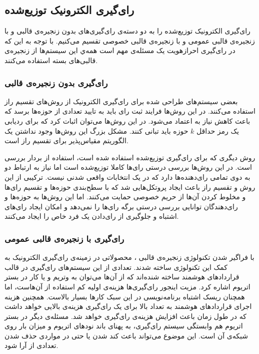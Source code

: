 \subsection{رای‌گیری الکترونیک توزیع‌شده}
رای‌گیری الکترونیک توزیع‌شده را به دو دسته‌ی رای‌گیری‌های بدون زنجیره‌ی قالبی و با زنجیره‌ی قالبی عمومی و با زنجیره‌ی قالبی خصوصی تقسیم می‌کنیم. با توجه به این که در رای‌گیری احرازهویت یک مسئله‌ی مهم است همه‌ي این سیستم‌ها از زنجیره‌ی قالبی‌های بسته استفاده می‌کنند.
\subsubsection{رای‌گیری بدون زنجیره‌ی قالبی} 
بعضی سیستم‌های طراحی شده برای رای‌گیری الکترونیک
\cite{secret1}
\cite{secret2}
\cite{secret3}
 از روش‌های تقسیم راز
 استفاده می‌کنند. در این روش‌ها فرایند ثبت رای باید به تایید تعدادی از حوزه‌ها برسد که باعث کاهش نیاز به اعتماد می‌شود. در این روش‌ها می‌توان اثبات کرد که برای ردیابی یک رمز حداقل $k$ حوزه باید تبانی کنند. مشکل بزرگ این روش‌ها وجود نداشتن یک الگوریتم مقیاس‌پذیر برای تقسیم راز است.
 \par
 روش دیگری که برای رای‌گیری توزیع‌شده استفاده شده است، استفاده از بردار‌ بررسی
 \cite{checkvector}
 است. در این روش‌ها بررسی درستی رای‌ها کاملا توزیع‌شده‌ است اما نیاز به ارتباط دو به دوی تمامی رای‌دهنده‌ها دارد که در یک انتخابات واقعی شدنی نیست. ترکیبی از این روش و تقسیم راز باعث ایجاد پروتکل‌هایی
 \cite{MPO1} \cite{evotinwocrypto}
  شد که با سطح‌بندی حوزه‌ها و تقسیم رای‌ها و مخلوط کردن آن‌ها از حریم خصوصی حمایت می‌کنند. اما این روش‌ها به حوزه‌ها و رای‌دهندگان توانایی بررسی درستی برگه رای‌ها را نمی‌دهد و امکان ایجاد رای‌های اشتباه و جلوگیری از رای‌دادن یک فرد خاص را ایجاد می‌کنند. 


\subsubsection{رای‌گیری با زنجیره‌ی قالبی عمومی}
با فراگیر شدن تکنولوژی زنجیره‌ی قالبی
\cite{rosgood}
، محصولاتی در زمینه‌ی رای‌گیری الکترونیک به کمک این تکنولوژی ساخته شدند. تعدادی از این سیستم‌های رای‌گیری در قالب قرارداد‌های هوشمند ساخته‌ شنده‌اند که از آن‌ها می‌توان به وتریم 
\cite{votereum}
و یا کار 
\cite{yavuz}
در بستر اتریوم اشاره کرد. مزیت اینجور رای‌گیری‌ها هزینه‌ی اولیه کم استفاده از آن‌هاست، اما همچنان ریسک اشتباه برنامه‌نویسی در این سبک کارها بسیار بالاست. همچنین هزینه اجرای قراردادهای هوشمند به تعداد بالا برای یک رای‌گیری هزینه‌ی بالایی خواهد داشت که در طول زمان باعث افزایش هزینه‌ی رای‌گیری خواهد شد. مسئله‌ی دیگر در بستر اتریوم هم وابستگی سیستم رای‌گیری، به پهنای باند نود‌های اتریوم و میزان بار روی شبکه‌ی آن است. این موضوع می‌تواند باعث کند شدن یا حتی در مواردی حذف شدن تعدادی از آرا شود.



